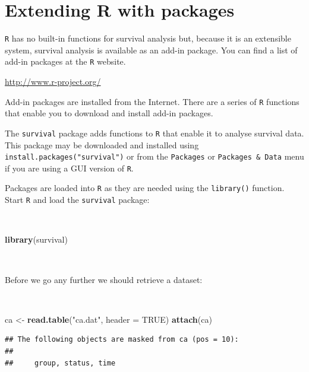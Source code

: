 \documentclass[12pt,a4paper]{book}
\newenvironment{Shaded}{\begin{snugshade}}{\end{snugshade}}
\newcommand{\KeywordTok}[1]{\textcolor[rgb]{0.13,0.29,0.53}{\textbf{#1}}}
\newcommand{\DataTypeTok}[1]{\textcolor[rgb]{0.13,0.29,0.53}{#1}}
\newcommand{\StringTok}[1]{\textcolor[rgb]{0.31,0.60,0.02}{#1}}
\newcommand{\OtherTok}[1]{\textcolor[rgb]{0.56,0.35,0.01}{#1}}
\newcommand{\NormalTok}[1]{#1}
\theoremstyle{definition}
\theoremstyle{definition}
\theoremstyle{definition}
\theoremstyle{remark}
\begin{document}
\hypertarget{exercise5}{%
\chapter{Extending R with packages}\label{exercise5}}

\texttt{R} has no built-in functions for survival analysis but, because
it is an extensible system, survival analysis is available as an add-in
package. You can find a list of add-in packages at the \texttt{R}
website.

\url{http://www.r-project.org/}

Add-in packages are installed from the Internet. There are a series of
\texttt{R} functions that enable you to download and install add-in
packages.

The \texttt{survival} package adds functions to \texttt{R} that enable
it to analyse survival data. This package may be downloaded and
installed using \texttt{install.packages("survival")} or from the
\texttt{Packages} or \texttt{Packages\ \&\ Data} menu if you are using a
GUI version of \texttt{R}.

Packages are loaded into \texttt{R} as they are needed using the
\texttt{library()} function. Start \texttt{R} and load the
\texttt{survival} package:

~

\begin{Shaded}
\begin{Highlighting}[]
\KeywordTok{library}\NormalTok{(survival)}
\end{Highlighting}
\end{Shaded}

~

Before we go any further we should retrieve a dataset:

~

\begin{Shaded}
\begin{Highlighting}[]
\NormalTok{ca <-}\StringTok{ }\KeywordTok{read.table}\NormalTok{(}\StringTok{"ca.dat"}\NormalTok{, }\DataTypeTok{header =} \OtherTok{TRUE}\NormalTok{)}
\KeywordTok{attach}\NormalTok{(ca)}
\end{Highlighting}
\end{Shaded}

\begin{verbatim}
## The following objects are masked from ca (pos = 10):
## 
##     group, status, time
\end{verbatim}

~
\end{document}
